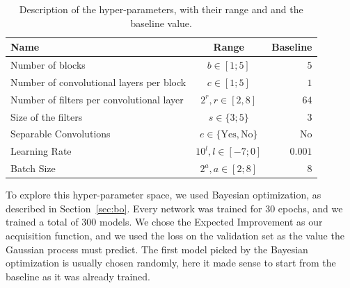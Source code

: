\begin{table}
	\centering
	\begin{tabular}{ | l | c | r | }
		\hline
		Name & Range & Baseline \\ \hline
		Number of blocks & $b \in [1 ; 5]$ & $5$ \\
		Number of convolutional layers per block & $c \in [1 ; 5]$ & $1$ \\
		Number of filters per convolutional layer & $2^{r}, r \in [2, 8]$ & $64$ \\
		Size of the filters & $ s \in \{3 ; 5\}$ & $3$ \\
		Separable Convolutions & $e \in \{\text{Yes}, \text{No}\}$ & No \\
		Learning Rate & $10^{l}, l \in [-7 ; 0]$ & $0.001$ \\
		Batch Size & $2^{a}, a \in [2 ; 8]$ & 8 \\
		\hline
	\end{tabular}
	\caption{Description of the hyper-parameters, with their range and and the baseline value.}
	\label{table:hyper}
\end{table}

To explore this hyper-parameter space, we used Bayesian optimization, as described in Section~\ref{sec:bo}. Every network was trained for 30 epochs, and we trained a total of 300 models. We chose the Expected Improvement as our acquisition function, and we used the loss on the validation set as the value the Gaussian process must predict. The first model picked by the Bayesian optimization is usually chosen randomly, here it made sense to start from the baseline as it was already trained.

